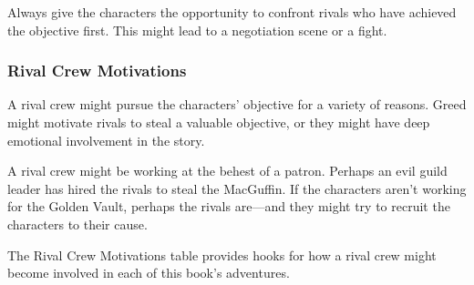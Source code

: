 \documentclass[10pt,a4paper,twoside,bg=print,twocolumn,openany,nodeprecatedcode]{dndbook}
\begin{document}
Always give the characters the opportunity to confront rivals who have achieved the objective first. This might lead to a negotiation scene or a fight.

\subsubsection{Rival Crew Motivations}
A rival crew might pursue the characters' objective for a variety of reasons. Greed might motivate rivals to steal a valuable objective, or they might have deep emotional involvement in the story.

A rival crew might be working at the behest of a patron. Perhaps an evil guild leader has hired the rivals to steal the MacGuffin. If the characters aren't working for the Golden Vault, perhaps the rivals are—and they might try to recruit the characters to their cause.

The Rival Crew Motivations table provides hooks for how a rival crew might become involved in each of this book's adventures.
\end{document}
